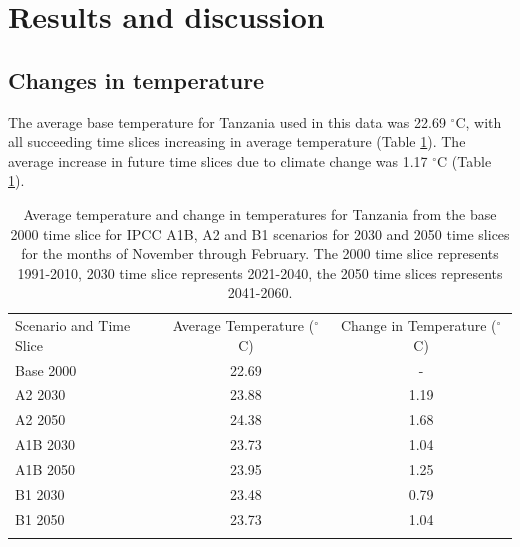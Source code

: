     \section{Results and discussion}
    \label{results_and_discussion}
    
    \subsection{Changes in temperature}
    \label{temperature_changes}
    The average base temperature for Tanzania used in this data was 22.69 $^{\circ}$C, with all succeeding time slices increasing in average temperature (Table \ref{tab:change}). The average increase in future time slices due to climate change was 1.17 $^{\circ}$C (Table \ref{tab:change}).
    
    
\begin{table}
\caption{Average temperature and change in temperatures  for Tanzania from the base 2000 time slice for IPCC A1B, A2 and B1 scenarios for 2030 and 2050 time slices for the months of November through February. The 2000 time slice represents 1991-2010, 2030 time slice represents 2021-2040, the 2050 time slices represents 2041-2060.}
\label{tab:change}       %
    \begin{tabular}{@{}lcc@{}}
\hline\noalign{\smallskip}
Scenario and Time Slice      & Average Temperature ($^{\circ}$C) & Change in Temperature ($^{\circ}$C)  \\
\noalign{\smallskip}\hline\noalign{\smallskip}
	Base 2000 	& 22.69                       & -                                   \\
    A2 2030  	& 23.88                       & 1.19                                \\
    A2 2050  	& 24.38                       & 1.68                                \\
    A1B 2030   	& 23.73                       & 1.04                                \\
    A1B 2050   	& 23.95                       & 1.25                                \\
    B1 2030   	& 23.48                       & 0.79                                \\
    B1 2050   	& 23.73                       & 1.04                                \\ 
\noalign{\smallskip}\hline
\end{tabular}
\end{table}  

